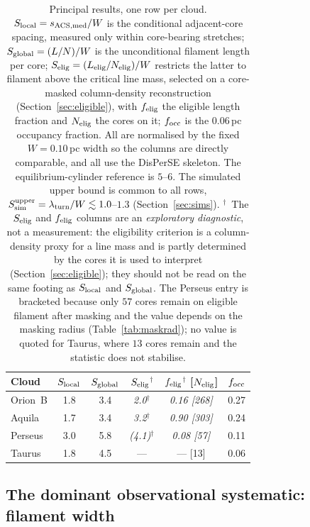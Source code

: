 \documentclass[usenatbib,twoside,twocolumn]{mnras}
\begin{document}
\begin{table}
\caption{Principal results, one row per cloud. $S_{\rm local}=s_{\rm ACS,med}/W$ is the conditional adjacent-core spacing, measured only within core-bearing stretches; $S_{\rm global}=(L/N)/W$ is the unconditional filament length per core; $S_{\rm elig}=(L_{\rm elig}/N_{\rm elig})/W$ restricts the latter to filament above the critical line mass, selected on a core-masked column-density reconstruction (Section~\ref{sec:eligible}), with $f_{\rm elig}$ the eligible length fraction and $N_{\rm elig}$ the cores on it; $f_{\rm occ}$ is the $0.06$\,pc occupancy fraction. All are normalised by the fixed $W=0.10$\,pc width so the columns are directly comparable, and all use the DisPerSE skeleton. The equilibrium-cylinder reference is $5$--$6$. The simulated upper bound is common to all rows, $S_{\rm sim}^{\rm upper}=\lambda_{\rm turn}/W\lesssim1.0$--$1.3$ (Section~\ref{sec:sims}). $^{\dagger}$~The $S_{\rm elig}$ and $f_{\rm elig}$ columns are an \emph{exploratory diagnostic}, not a measurement: the eligibility criterion is a column-density proxy for a line mass and is partly determined by the cores it is used to interpret (Section~\ref{sec:eligible}); they should not be read on the same footing as $S_{\rm local}$ and $S_{\rm global}$. The Perseus entry is bracketed because only $57$ cores remain on eligible filament after masking and the value depends on the masking radius (Table~\ref{tab:maskrad}); no value is quoted for Taurus, where $13$ cores remain and the statistic does not stabilise.}
\label{tab:principal}
\footnotesize
\setlength{\tabcolsep}{4pt}
\begin{tabular}{lccccc}
\toprule
Cloud & $S_{\rm local}$ & $S_{\rm global}$ & \emph{$S_{\rm elig}$}$^{\dagger}$ & \emph{$f_{\rm elig}$}$^{\dagger}$ [$N_{\rm elig}$] & $f_{\rm occ}$ \\
\midrule
Orion~B & 1.8 & 3.4 & \emph{2.0}$^{\dagger}$ & \emph{0.16 [268]} & 0.27 \\
Aquila  & 1.7 & 3.4 & \emph{3.2}$^{\dagger}$ & \emph{0.90 [303]} & 0.24 \\
Perseus & 3.0 & 5.8 & \emph{(4.1)}$^{\dagger}$ & \emph{0.08 [57]} & 0.11 \\
Taurus  & 1.8 & 4.5 & ---    & --- [13]   & 0.06 \\
\bottomrule
\end{tabular}
\end{table}



\subsection{The dominant observational systematic: filament width}
\label{sec:width}
\end{document}
